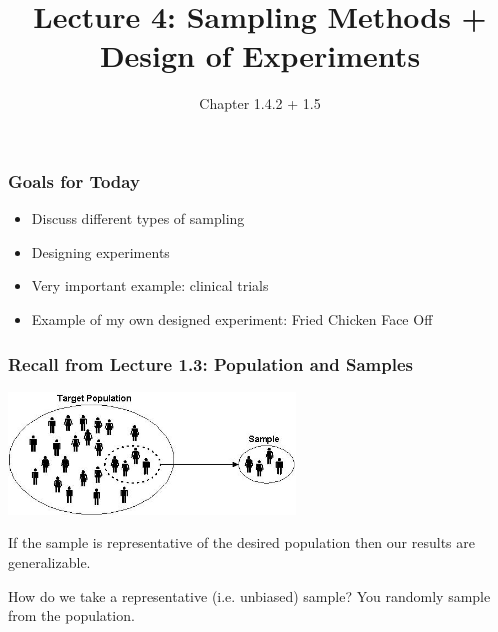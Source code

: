 \documentclass[handout]{beamer}
\title{Lecture 4: Sampling Methods + Design of Experiments}
\author{Chapter 1.4.2 + 1.5}
\date{}
\newcommand{\blue}[1]{\textcolor{blue2}{#1}}
\begin{document}
\begin{frame}
\titlepage
\end{frame}


\begin{frame}
\frametitle{Goals for Today}

\begin{itemize}
\item Discuss different types of sampling
\item Designing experiments
\item Very important example:  clinical trials
\item Example of my own designed experiment: Fried Chicken Face Off
\end{itemize}

\end{frame}


\begin{frame}
\frametitle{Recall from Lecture 1.3: Population and Samples}

\begin{center}
\includegraphics[width=3in]{figure/target-population.jpg} 
\end{center}


\pause If the sample is representative of the desired population then our results are \blue{generalizable}.  

\vskip 0.5cm

\pause How do we take a representative (i.e. unbiased) sample?  You \blue{randomly} sample from the population.

\end{frame}
\end{document}
